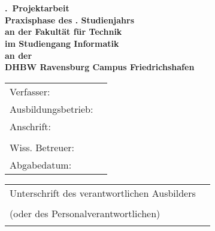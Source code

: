 \begin{titlepage}
	\begin{center}
		\vspace*{1cm}
		\LARGE\bf\myTopic\\
		\Large\rm\mySubTopic\\
		\vspace*{2cm}
		\bf \myProjNumber.~Projektarbeit\\
		\vspace*{1cm}
		\normalsize\rm
		Praxisphase des \myPraxPhase. Studienjahrs \\
		\vspace*{1cm}
		an der Fakultät für Technik\\
		im Studiengang Informatik\\
		\vspace*{1cm}
		an der\\
		DHBW Ravensburg Campus Friedrichshafen
		\vfill
	\end{center}
	\begin{tabular}{ll}
		Verfasser:&\myAutor\\
		Ausbildungsbetrieb:&\myCompany\\
		Anschrift:&\myCompanyAddressStreet\\
		&\myCompanyAddressCity\\
		Wiss. Betreuer:&\myProf\\
		Abgabedatum:&\myEndDate\\
	\end{tabular}
	\newline
	\vspace*{1cm}
	\newline
	\begin{tabularx}{\textwidth}{l@{\extracolsep\fill}r}
	  Unterschrift des verantwortlichen Ausbilders&\\
	  (oder des Personalverantwortlichen)&\rule{6cm}{0.3mm}\\
	\end{tabularx}
\end{titlepage}
\newpage
\setcounter{page}{2}
